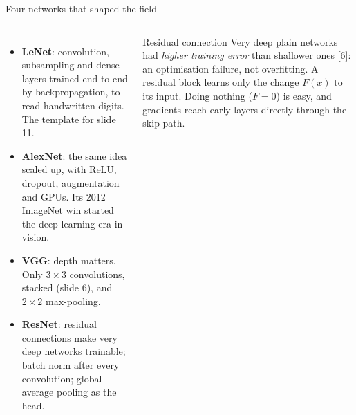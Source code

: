 \documentclass[aspectratio=169,10pt]{beamer}
\renewcommand{\cite}[1]{{\scriptsize\color{cTok}[#1]}}
\newcommand{\key}[1]{\textbf{\color{cAtt}#1}}
\DeclareMathOperator{\ReLU}{ReLU}
\begin{document}
\begin{frame}{Four networks that shaped the field}
\begin{columns}[T,onlytextwidth]
\vspace{0.8mm}
\footnotesize
\begin{itemize}
  \item \key{LeNet}: convolution, subsampling and dense layers trained end to end by backpropagation, to read
        handwritten digits. The template for slide 11.
  \item \key{AlexNet}: the same idea scaled up, with ReLU, dropout, augmentation and GPUs.
        Its 2012 ImageNet win started the deep-learning era in vision.
  \item \key{VGG}: depth matters. Only $3\times3$ convolutions, stacked (slide 6), and $2\times2$ max-pooling.
  \item \key{ResNet}: residual connections make very deep networks trainable; batch norm after every
        convolution; global average pooling as the head.
\end{itemize}
\centering
{}

\vspace{0.5mm}
\begin{block}{Residual connection}
\footnotesize
Very deep plain networks had \emph{higher training error} than shallower ones \cite{6}:
an optimisation failure, not overfitting. A residual block learns only the change $F(x)$ to its input.
Doing nothing ($F=0$) is easy, and gradients reach early layers directly through the skip path.
\end{block}
\end{columns}
\end{frame}
\end{document}
